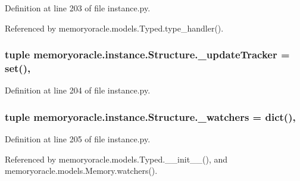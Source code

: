 Definition at line 203 of file instance.\+py.



Referenced by memoryoracle.\+models.\+Typed.\+type\+\_\+handler().

\hypertarget{classmemoryoracle_1_1instance_1_1Structure_ae63c5b3c5f79bf71f88a43325085d251}{}
\subsubsection[{\+\_\+update\+Tracker}]{\setlength{\rightskip}{0pt plus 5cm}tuple memoryoracle.\+instance.\+Structure.\+\_\+update\+Tracker = set()\hspace{0.3cm}{\ttfamily [static]}, {\ttfamily [private]}}\label{classmemoryoracle_1_1instance_1_1Structure_ae63c5b3c5f79bf71f88a43325085d251}


Definition at line 204 of file instance.\+py.

\hypertarget{classmemoryoracle_1_1instance_1_1Structure_a0b0148c77593c771c18b3f69eee9c3a9}{}
\subsubsection[{\+\_\+watchers}]{\setlength{\rightskip}{0pt plus 5cm}tuple memoryoracle.\+instance.\+Structure.\+\_\+watchers = dict()\hspace{0.3cm}{\ttfamily [static]}, {\ttfamily [private]}}\label{classmemoryoracle_1_1instance_1_1Structure_a0b0148c77593c771c18b3f69eee9c3a9}


Definition at line 205 of file instance.\+py.



Referenced by memoryoracle.\+models.\+Typed.\+\_\+\+\_\+init\+\_\+\+\_\+(), and memoryoracle.\+models.\+Memory.\+watchers().

\hypertarget{classmemoryoracle_1_1instance_1_1Structure_a5a8dcad9bb85bbde2676e9b6e9fa138e}{}
